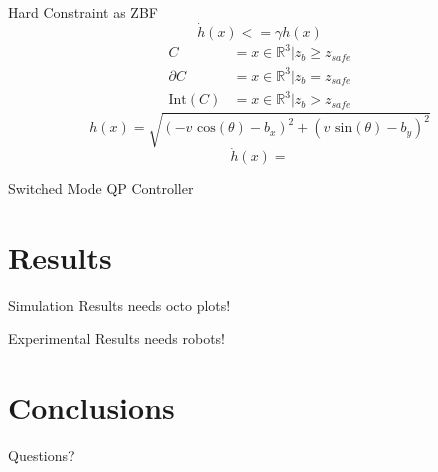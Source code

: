 \documentclass[10pt]{beamer}
\begin{document}
\begin{frame}{Hard Constraint as ZBF}
$$\dot{h}(x)<=\gamma h(x)$$\pause
\begin{align*}
C &= {x \in \mathbb{R}^3 | z_b\geq z_{safe}}\\
\partial C &= {x \in \mathbb{R}^3 | z_b=z_{safe}}\\
\text{Int}(C) &= {x \in \mathbb{R}^3 | z_b > z_{safe}}
\end{align*}\pause
$$h(x)=\sqrt{(-v\text{ cos}(\theta)-b_x)^2+(v\text{ sin}(\theta)-b_y)^2}$$\pause
$$\dot{h}(x)=$$

\end{frame}

\begin{frame}{Switched Mode QP Controller}

\end{frame}

\section{Results}
\begin{frame}{Simulation Results}
needs octo plots!
\end{frame}

\begin{frame}{Experimental Results}
needs robots!
\end{frame}

\section{Conclusions}
\begin{frame}{}

\end{frame}


\begin{frame}[standout]
Questions?
\end{frame}
\end{document}
